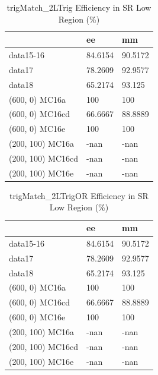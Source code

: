 \begin{table}
\begin{center}
\caption{trigMatch\_2LTrig Efficiency in SR Low Region (\%)}
\begin{tabular}{l|l|l}
& ee & mm \\
\hline
data15-16 & 84.6154 & 90.5172 \\
data17 & 78.2609 & 92.9577 \\
data18 & 65.2174 & 93.125 \\
(600, 0) MC16a & 100 & 100 \\
(600, 0) MC16cd & 66.6667 & 88.8889 \\
(600, 0) MC16e & 100 & 100 \\
(200, 100) MC16a & -nan & -nan \\
(200, 100) MC16cd & -nan & -nan \\
(200, 100) MC16e & -nan & -nan \\
\end{tabular}
\end{center}
\end{table}

\begin{table}
\begin{center}
\caption{trigMatch\_2LTrigOR Efficiency in SR Low Region (\%)}
\begin{tabular}{l|l|l}
& ee & mm \\
\hline
data15-16 & 84.6154 & 90.5172 \\
data17 & 78.2609 & 92.9577 \\
data18 & 65.2174 & 93.125 \\
(600, 0) MC16a & 100 & 100 \\
(600, 0) MC16cd & 66.6667 & 88.8889 \\
(600, 0) MC16e & 100 & 100 \\
(200, 100) MC16a & -nan & -nan \\
(200, 100) MC16cd & -nan & -nan \\
(200, 100) MC16e & -nan & -nan \\
\end{tabular}
\end{center}
\end{table}

